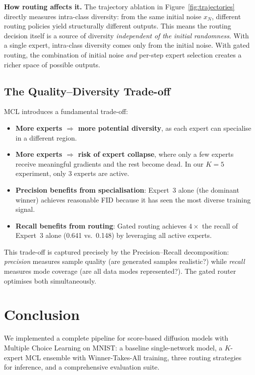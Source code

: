 \documentclass[11pt,a4paper]{article}
\begin{document}
\textbf{How routing affects it.} The trajectory ablation in
Figure~\ref{fig:trajectories} directly measures intra-class diversity: from the
same initial noise $x_N$, different routing policies yield structurally
different outputs. This means the routing decision itself is a source of
diversity \emph{independent of the initial randomness}. With a single
expert, intra-class diversity comes only from the initial noise. With
gated routing, the combination of initial noise \emph{and} per-step expert
selection creates a richer space of possible outputs.

\subsection{The Quality--Diversity Trade-off}

MCL introduces a fundamental trade-off:
\begin{itemize}[nosep]
  \item \textbf{More experts $\Rightarrow$ more potential diversity},
    as each expert can specialise in a different region.
  \item \textbf{More experts $\Rightarrow$ risk of expert collapse},
    where only a few experts receive meaningful gradients and the rest
    become dead. In our $K=5$ experiment, only 3 experts are active.
  \item \textbf{Precision benefits from specialisation}: Expert~3 alone
    (the dominant winner) achieves reasonable FID because it has seen the
    most diverse training signal.
  \item \textbf{Recall benefits from routing}: Gated routing achieves
    $4\times$ the recall of Expert~3 alone (0.641 vs.\ 0.148) by
    leveraging all active experts.
\end{itemize}

This trade-off is captured precisely by the Precision--Recall decomposition:
\emph{precision} measures sample quality (are generated samples realistic?)
while \emph{recall} measures mode coverage (are all data modes represented?).
The gated router optimises both simultaneously.

\section{Conclusion}

We implemented a complete pipeline for score-based diffusion models with
Multiple Choice Learning on MNIST: a baseline single-network model, a
$K$-expert MCL ensemble with Winner-Takes-All training, three routing
strategies for inference, and a comprehensive evaluation suite.
\end{document}
